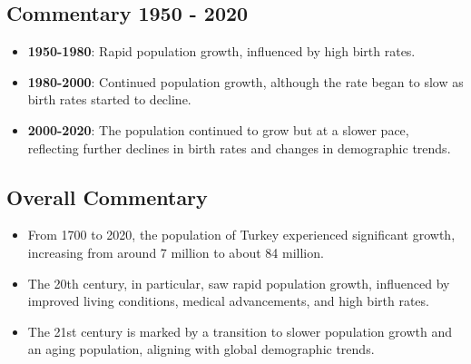 \subsection*{Commentary 1950 - 2020}
\begin{itemize}
    \item \textbf{1950-1980}: Rapid population growth, influenced by high birth rates.
    \item \textbf{1980-2000}: Continued population growth, although the rate began to slow as birth rates started to decline.
    \item \textbf{2000-2020}: The population continued to grow but at a slower pace, reflecting further declines in birth rates and changes in demographic trends.
\end{itemize}

\subsection*{Overall Commentary}
\begin{itemize}
    \item From 1700 to 2020, the population of Turkey experienced significant growth, increasing from around 7 million to about 84 million.
    \item The 20th century, in particular, saw rapid population growth, influenced by improved living conditions, medical advancements, and high birth rates.
    \item The 21st century is marked by a transition to slower population growth and an aging population, aligning with global demographic trends.
\end{itemize}